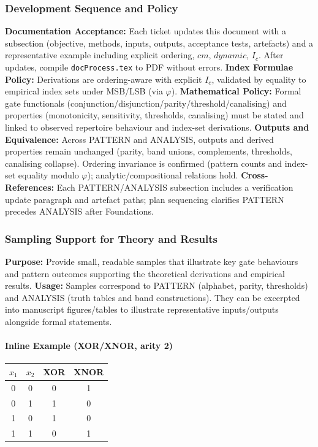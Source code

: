\subsubsection{Development Sequence and Policy}
\textbf{Documentation Acceptance:} Each ticket updates this document with a subsection (objective, methods, inputs, outputs, acceptance tests, artefacts) and a representative example including explicit ordering, \(cm\), \(dynamic\), \(I_c\). After updates, compile \texttt{docProcess.tex} to PDF without errors.
\textbf{Index Formulae Policy:} Derivations are ordering-aware with explicit \(I_c\), validated by equality to empirical index sets under MSB/LSB (via \(\varphi\)).
\textbf{Mathematical Policy:} Formal gate functionals (conjunction/disjunction/parity/threshold/canalising) and properties (monotonicity, sensitivity, thresholds, canalising) must be stated and linked to observed repertoire behaviour and index-set derivations.
\textbf{Outputs and Equivalence:} Across PATTERN and ANALYSIS, outputs and derived properties remain unchanged (parity, band unions, complements, thresholds, canalising collapse). Ordering invariance is confirmed (pattern counts and index-set equality modulo \(\varphi\)); analytic/compositional relations hold.
\textbf{Cross-References:} Each PATTERN/ANALYSIS subsection includes a verification update paragraph and artefact paths; plan sequencing clarifies PATTERN precedes ANALYSIS after Foundations.
\subsubsection{Sampling Support for Theory and Results}
\textbf{Purpose:} Provide small, readable samples that illustrate key gate behaviours and pattern outcomes supporting the theoretical derivations and empirical results.
\textbf{Usage:} Samples correspond to PATTERN (alphabet, parity, thresholds) and ANALYSIS (truth tables and band constructions). They can be excerpted into manuscript figures/tables to illustrate representative inputs/outputs alongside formal statements.
\paragraph{Inline Example (XOR/XNOR, arity 2)}
\begin{center}
\begin{tabular}{cc|cc}
\toprule
$x_1$ & $x_2$ & XOR & XNOR \\
\midrule
0 & 0 & 0 & 1 \\
0 & 1 & 1 & 0 \\
1 & 0 & 1 & 0 \\
1 & 1 & 0 & 1 \\
\bottomrule
\end{tabular}
\end{center}
